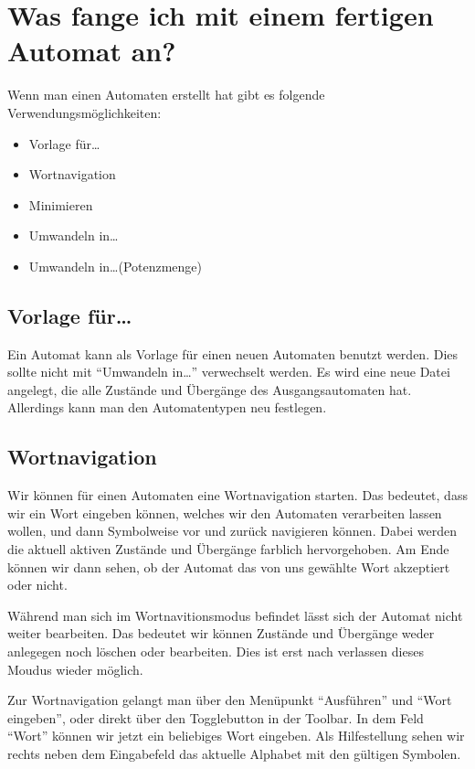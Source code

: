 \section{Was fange ich mit einem fertigen Automat an?}

Wenn man einen Automaten erstellt hat gibt es folgende
Ver\-wen\-dungs\-möglich\-keiten:

\begin{itemize}
  \item Vorlage für\ldots
  \item Wortnavigation
  \item Minimieren
  \item Umwandeln in\ldots
  \item Umwandeln in\ldots (Potenzmenge)
\end{itemize}

\subsection{Vorlage für\ldots}
  
  Ein Automat kann als Vorlage für einen neuen Automaten benutzt werden. Dies
  sollte nicht mit "`Umwandeln in\ldots"' verwechselt werden. Es wird eine neue
  Datei angelegt, die alle Zustände und Übergänge des Ausgangsautomaten hat.
  Allerdings kann man den Automatentypen neu festlegen.
  
\subsection{Wortnavigation}
  
  Wir können für einen Automaten eine Wortnavigation starten. Das bedeutet,
  dass wir ein Wort eingeben können, welches wir den Automaten verarbeiten
  lassen wollen, und dann Symbolweise vor und zurück navigieren können. Dabei
  werden die aktuell aktiven Zustände und Übergänge farblich hervorgehoben. Am
  Ende können wir dann sehen, ob der Automat das von uns gewählte Wort
  akzeptiert oder nicht.\vspace{10pt}
  
  Während man sich im Wortnavitionsmodus
  befindet lässt sich der Automat nicht weiter bearbeiten. Das bedeutet
  wir können Zustände und Übergänge weder anlegegen noch löschen
  oder bearbeiten. Dies ist erst nach verlassen dieses Moudus wieder
  möglich.\vspace{10pt}
  
  Zur Wortnavigation gelangt man über den Menüpunkt "`Ausführen"' und "`Wort
  eingeben"', oder direkt über den Togglebutton in der Toolbar. In dem
  Feld "`Wort"' können wir jetzt ein beliebiges Wort eingeben. Als
  Hilfestellung sehen wir rechts neben dem Eingabefeld das aktuelle Alphabet
  mit den gültigen Symbolen.\vspace{10pt}
  
